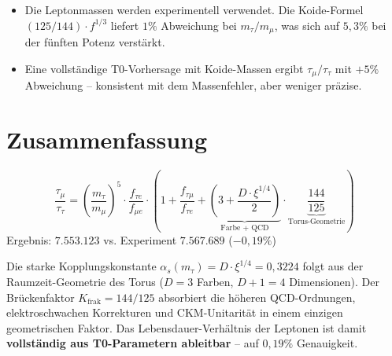 	\begin{itemize}
		\item Die Leptonmassen werden experimentell verwendet. Die Koide-Formel $(125/144) \cdot f^{1/3}$ liefert $1\%$ Abweichung bei $m_\tau/m_\mu$, was sich auf $5{,}3\%$ bei der fünften Potenz verstärkt.
		\item Eine vollständige T0-Vorhersage mit Koide-Massen ergibt $\tau_\mu/\tau_\tau$ mit $+5\%$ Abweichung -- konsistent mit dem Massenfehler, aber weniger präzise.
	\end{itemize}
	
	
	\section{Zusammenfassung}
	
	\begin{keypoint}
		\begin{equation}
			\frac{\tau_\mu}{\tau_\tau} = \left(\frac{m_\tau}{m_\mu}\right)^5 \cdot \frac{f_{\tau e}}{f_{\mu e}} \cdot \left(1 + \frac{f_{\tau\mu}}{f_{\tau e}} + \underbrace{\left(3 + \frac{D \cdot \xi^{1/4}}{2}\right)}_{\text{Farbe + QCD}} \cdot \underbrace{\frac{144}{125}}_{\text{Torus-Geometrie}}\right)
		\end{equation}
		Ergebnis: $7{.}553{.}123$ vs. Experiment $7{.}567{.}689$ (\textbf{$-0{,}19\%$})
	\end{keypoint}
	
	Die starke Kopplungskonstante $\alpha_s(m_\tau) = D \cdot \xi^{1/4} = 0{,}3224$ folgt aus der Raumzeit-Geometrie des Torus ($D = 3$ Farben, $D+1 = 4$ Dimensionen). Der Brückenfaktor $K_\text{frak} = 144/125$ absorbiert die höheren QCD-Ordnungen, elektroschwachen Korrekturen und CKM-Unitarität in einem einzigen geometrischen Faktor. Das Lebensdauer-Verhältnis der Leptonen ist damit \textbf{vollständig aus T0-Parametern ableitbar} -- auf $0{,}19\%$ Genauigkeit.
